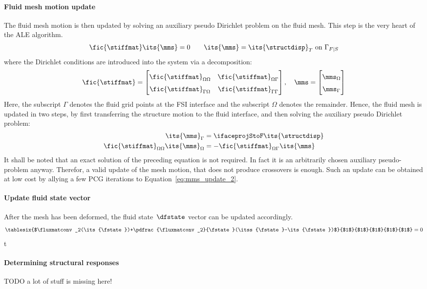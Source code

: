 \documentclass[../main.tex]{subfiles}
\begin{document}
\paragraph{\raisebox{.5pt}{\textcircled{\raisebox{-.9pt} {3}}} Fluid mesh motion update}
The fluid mesh motion is then updated by solving an auxiliary pseudo Dirichlet problem on the fluid mesh. This step is the very heart of the ALE algorithm.
\begin{align}
\fic{\stiffmat} \its{\mms} = 0~~~\text{}~~~\its{\mms}=\its{\structdisp}_T~\text{on}~\Gamma_{F|S}
\end{align}
where the Dirichlet conditions are introduced into the system via a decomposition:
\begin{align}
\fic{\stiffmat}=
\begin{bmatrix}
\fic{\stiffmat}_{\Omega\Omega}   &  \fic{\stiffmat}_{\Omega\Gamma}   \\
\fic{\stiffmat}_{\Gamma\Omega}   &  \fic{\stiffmat}_{\Gamma\Gamma}   \\
\end{bmatrix},~~~
\mms=
\begin{bmatrix}
\mms_{\Omega} \\
\mms_{\Gamma} \\
\end{bmatrix}
\end{align}
Here, the subscript $\Gamma$ denotes the fluid grid points at the FSI interface and the subscript $\Omega$ denotes the remainder. Hence, the fluid mesh is updated in two steps, by first transferring the structure motion to the fluid interface, and then solving the auxiliary pseudo Dirichlet problem:
\begin{align}
\its{\mms}_{\Gamma}&=\ifaceprojStoF \its{\structdisp}\label{eq:mms_update_1}\\
\fic{\stiffmat}_{\Omega\Omega} \its{\mms}_\Omega &= -\fic{\stiffmat}_{\Omega\Gamma} \its{\mms} \label{eq:mms_update_2}
\end{align}
It shall be noted that an exact solution of the preceding equation is not required. In fact it is an arbitrarily chosen auxiliary pseudo-problem anyway. Therefor, a valid update of the mesh motion, that does not produce crossovers is enough. Such an update can be obtained at low cost by allying a few \ac{PCG} iterations to Equation~\eqref{eq:mms_update_2}.

\paragraph{\raisebox{.5pt}{\textcircled{\raisebox{-.9pt} {4}}} Update fluid state vector}
After the mesh has been deformed, the fluid state~$\dfstate$ vector can be updated accordingly.
\begin{align}
\def\arraystretch{1.5}
\tablesix
{$\fluxmatconv_2(\its{\fstate})+\pdfrac{\fluxmatconv_2}{\fstate}(\itss{\fstate}-\its{\fstate})$}
{$1$}
{$1$}
{$1$}
{$1$}
{$1$}
=0
\end{align}
t%
\paragraph{\raisebox{.5pt}{\textcircled{\raisebox{-.9pt} {5}}} Determining structural responses}

TODO a lot of stuff is missing here!
\end{document}
